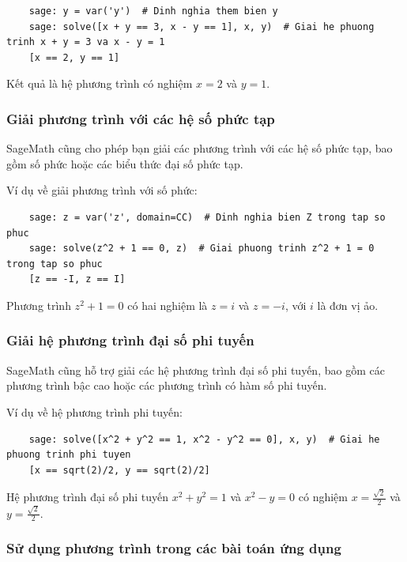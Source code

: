 \begin{lstlisting}
	sage: y = var('y')  # Dinh nghia them bien y
	sage: solve([x + y == 3, x - y == 1], x, y)  # Giai he phuong trinh x + y = 3 va x - y = 1
	[x == 2, y == 1]
\end{lstlisting}

Kết quả là hệ phương trình có nghiệm \(x = 2\) và \(y = 1\).

\subsubsection{Giải phương trình với các hệ số phức tạp}

SageMath cũng cho phép bạn giải các phương trình với các hệ số phức tạp, bao gồm số phức hoặc các biểu thức đại số phức tạp.

Ví dụ về giải phương trình với số phức:

\begin{lstlisting}
	sage: z = var('z', domain=CC)  # Dinh nghia bien Z trong tap so phuc
	sage: solve(z^2 + 1 == 0, z)  # Giai phuong trinh z^2 + 1 = 0 trong tap so phuc
	[z == -I, z == I]
\end{lstlisting}

Phương trình \(z^2 + 1 = 0\) có hai nghiệm là \(z = i\) và \(z = -i\), với \(i\) là đơn vị ảo.

\subsubsection{Giải hệ phương trình đại số phi tuyến}

SageMath cũng hỗ trợ giải các hệ phương trình đại số phi tuyến, bao gồm các phương trình bậc cao hoặc các phương trình có hàm số phi tuyến.

Ví dụ về hệ phương trình phi tuyến:

\begin{lstlisting}
	sage: solve([x^2 + y^2 == 1, x^2 - y^2 == 0], x, y)  # Giai he phuong trinh phi tuyen
	[x == sqrt(2)/2, y == sqrt(2)/2]
\end{lstlisting}

Hệ phương trình đại số phi tuyến \(x^2 + y^2 = 1\) và \(x^2 - y = 0\) có nghiệm \(x = \frac{\sqrt{2}}{2}\) và \(y = \frac{\sqrt{2}}{2}\).

\subsubsection{Sử dụng phương trình trong các bài toán ứng dụng}

